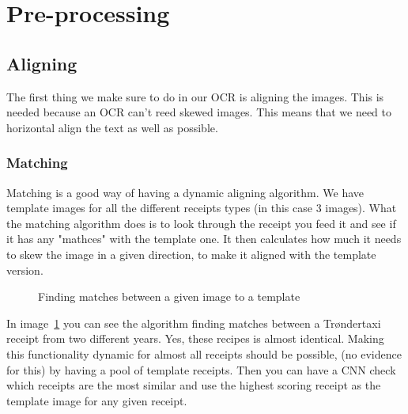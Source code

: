 \section{Pre-processing}\label{sec:pre-processing2}

\subsection{Aligning}\label{subsec:aligning}

The first thing we make sure to do in our OCR is aligning the images.
This is needed because an OCR can't reed skewed images.
This means that we need to horizontal align the text as well as possible.

\subsubsection[aligning]{Matching}

Matching is a good way of having a dynamic aligning algorithm.
We have template images for all the different receipts types (in this case 3 images).
What the matching algorithm does is to look through the receipt you feed it and see if it has any "mathces" with the template one.
It then calculates how much it needs to skew the image in a given direction, to make it aligned with the template version.

\begin{figure}[h]
    \caption{Finding matches between a given image to a template}
    \label{fig:OCR matching}
\end{figure}

In image~\ref{fig:OCR matching} you can see the algorithm finding matches between a Trøndertaxi receipt from two
different years.
Yes, these recipes is almost identical.
Making this functionality dynamic for almost all receipts should be possible, (no evidence for this) by having a pool of template receipts.
Then you can have a CNN check which receipts are the most similar and use the highest scoring receipt as the template image for any given receipt.

